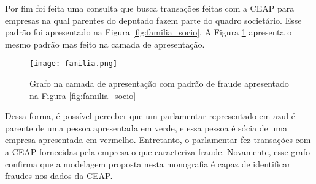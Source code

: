 Por fim foi feita uma consulta que busca transações feitas com a CEAP para empresas na qual parentes do deputado fazem parte do quadro societário. Esse padrão foi apresentado na Figura \ref{fig:familia_socio}. A Figura \ref{fig:familia_grafo} apresenta o mesmo padrão mas feito na camada de apresentação.

\begin{figure}[H]
\centering
\texttt{[image: familia.png]}
\caption{Grafo na camada de apresentação com padrão de fraude apresentado na Figura \ref{fig:familia_socio}}
\label{fig:familia_grafo}
\end{figure}

Dessa forma, é possível perceber que um parlamentar representado em azul é parente de uma pessoa apresentada em verde, e essa pessoa é sócia de uma empresa apresentada em vermelho. Entretanto, o parlamentar fez transações com a CEAP fornecidas pela empresa o que caracteriza fraude. Novamente, esse grafo confirma que a modelagem proposta nesta monografia é capaz de identificar fraudes nos dados da CEAP. 